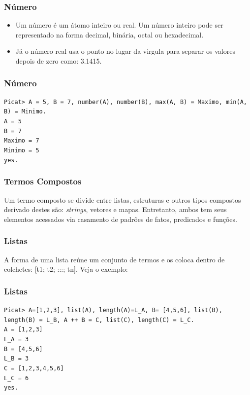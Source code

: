 \documentclass{beamer}
\begin{document}

\begin{frame}
    \frametitle{Número}
    \begin{itemize}
     \item Um número é um átomo inteiro ou real. Um número inteiro pode ser representado na forma decimal, binária, octal ou hexadecimal. 
     \item Já o número real usa o ponto no lugar da virgula para separar os valores depois de zero como: 3.1415.
    \end{itemize}
\end{frame}


\begin{frame}
    \frametitle{Número}
    \texttt{Picat> A = 5, B = 7, number(A), number(B),
    max(A, B) = Maximo, min(A, B) = Minimo.}\\
  
    \texttt{A = 5}\\
    \texttt{B = 7}\\
    \texttt{Maximo = 7}\\
    \texttt{Minimo = 5}\\
    \texttt{yes.}
\end{frame}


\begin{frame}
    \frametitle{Termos Compostos}
    Um termo composto se divide entre listas,  estruturas e outros tipos compostos derivado destes são: 
    \textit{strings}, vetores e mapas. Entretanto, ambos tem seus elementos acessados via casamento de padrões de fatos, predicados e funções.
\end{frame}


\begin{frame}
    \frametitle{Listas}
    A forma de uma lista reúne um conjunto de termos e os coloca dentro de colchetes: [t1; t2; :::; tn]. Veja o exemplo:
\end{frame}


\begin{frame}
    \frametitle{Listas}
    \texttt{Picat> A=[1,2,3], list(A), length(A)=L\_A, B= [4,5,6], list(B),}\\
    \texttt{length(B) = L\_B, A ++ B = C, list(C), length(C) = L\_C.}\\

    \texttt{A = [1,2,3]}\\
    \texttt{L\_A = 3}\\
    \texttt{B = [4,5,6]}\\
    \texttt{L\_B = 3}\\
    \texttt{C = [1,2,3,4,5,6]}\\
    \texttt{L\_C = 6}\\
    \texttt{yes.}
\end{frame}
\end{document}
